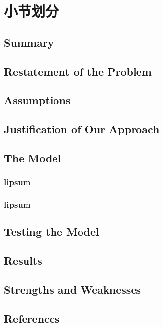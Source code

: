 \documentclass[openany]{ctexbook}
\begin{document}
\chapter{小节划分}
    \section*{Summary}
    \lipsum[1]

    \section{Restatement of the Problem}
    \lipsum[2]

    \section{Assumptions}
    \lipsum[3]

    \section{Justification of Our Approach}
    \lipsum[4]

    \section{The Model}
        \subsection{lipsum}
        \lipsum[5]

        \subsection{lipsum}
        \lipsum[6]

    \section{Testing the Model}
    \lipsum[7]

    \section{Results}
    \lipsum[8]

    \section{Strengths and Weaknesses}
    \lipsum[9]

    \section*{References}
    \lipsum[10]
\end{document}
